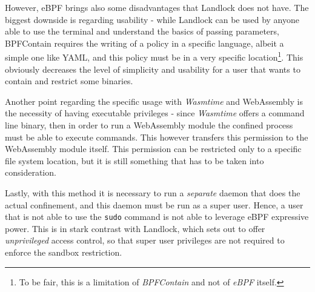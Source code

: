 However, eBPF brings also some disadvantages that Landlock does not have.
The biggest downside is regarding usability - while Landlock can be used by anyone able to use
the terminal and understand the basics of passing parameters, BPFContain requires the writing
of a policy in a specific language, albeit a simple one like YAML, and this policy must be in a very
specific location\footnote{To be fair, this is a limitation of \textit{BPFContain} and not of \textit{eBPF} itself.}.
This obviously decreases the level of simplicity and usability for a user that wants to contain and restrict
some binaries.

Another point regarding the specific usage with \textit{Wasmtime} and WebAssembly is the necessity of
having executable privileges - since \textit{Wasmtime} offers a command line binary, then in order to run
a WebAssembly module the confined process must be able to execute commands. This however transfers this
permission to the WebAssembly module itself. This permission can be restricted only to a specific file system
location, but it is still something that has to be taken into consideration.

Lastly, with this method it is necessary to run a \textit{separate} daemon that does the actual
confinement, and this daemon must be run as a super user.
Hence, a user that is not able to use the \texttt{sudo} command is not able to leverage eBPF
expressive power.
This is in stark contrast with Landlock, which sets out to offer \textit{unprivileged} access control,
so that super user privileges are not required to enforce the sandbox restriction.